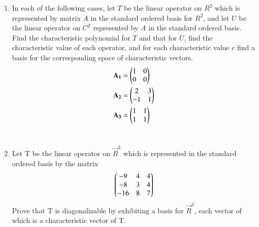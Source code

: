 \renewcommand{\theequation}{\theenumi}
\renewcommand{\thefigure}{\theenumi}
\begin{enumerate}[label=\thesubsection.\arabic*.,ref=\thesubsection.\theenumi]


\item In each of the following cases, let $T$ be the linear operator on $R^2$ which is represented by matrix $A$ in the standard ordered basis for $R^2$, and let $U$ be the linear operator on $C^2$ represented by $A$ in the standard ordered basis. Find the characteristic polynomial for $T$ and that for $U$, find the characteristic value of each operator, and for each characteristic value $c$ find a basis for the corresponding space of characteristic vectors.
\begin{align}
    \mathbf{A_1} &= \begin{pmatrix}1&0\\
                     0&0\end{pmatrix}\\
    \mathbf{A_2} &= \begin{pmatrix}2&3\\
                     -1&1\end{pmatrix}\\
    \mathbf{A_3} &= \begin{pmatrix}1&1\\
                     1&1\end{pmatrix}
\end{align}     
%
%
\\
\solution

\item Let T be the linear operator on $\vec{R}^3$ which is represented in the standard ordered basis by the matrix
\begin{align}
\begin{pmatrix}-9&4&4\\-8&3&4\\-16&8&7\end{pmatrix}
\label{eq:solutions/6/2/4/Q}
\end{align}
Prove that T is diagonalizable by exhibiting a basis for $\vec{R}^3$, each vector of which is a characteristic vector of T. 
%
%
\\
\solution

\end{enumerate}
